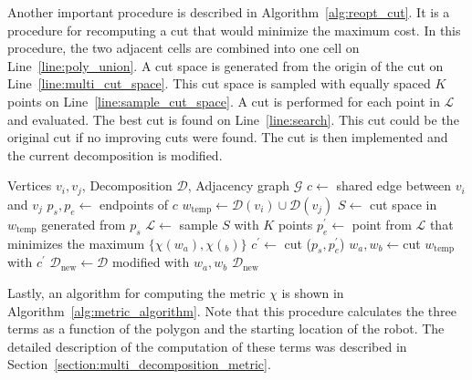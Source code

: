 \documentclass[../main.tex]{subfiles}
\begin{document}
Another important procedure is described in Algorithm~\ref{alg:reopt_cut}. It is a procedure for recomputing a cut that would minimize the maximum cost. In this procedure, the two adjacent cells are combined into one cell on Line~\ref{line:poly_union}. A cut space is generated from the origin of the cut on Line~\ref{line:multi_cut_space}. This cut space is sampled with equally spaced $K$ points on Line~\ref{line:sample_cut_space}. A cut is performed for each point in $\mathcal{L}$ and evaluated. The best cut is found on Line~\ref{line:search}. This cut could be the original cut if no improving cuts were found. The cut is then implemented and the current decomposition is modified.

\begin{algorithm}
	\caption{$\text{reopt\_cut}(v_i, v_j, \mathcal{D},\mathcal{G})$}
	\label{alg:reopt_cut}
	\begin{algorithmic}[1]
		\REQUIRE Vertices $v_i, v_j$, Decomposition $\mathcal{D}$, Adjacency graph $\mathcal{G}$
			\STATE $c\gets$ shared edge between $v_i$ and $v_j$ \label{line:shared_edge}
			\STATE $p_s,p_e\gets$ endpoints of $c$
			\STATE $w_{\text{temp}}\gets \mathcal{D}(v_i)\cup\mathcal{D}(v_j)$ \label{line:poly_union}
			\STATE $S\gets$ cut space in $w_{\text{temp}}$ generated from $p_s$ \label{line:multi_cut_space}
			\STATE $\mathcal{L}\gets$ sample $S$ with $K$ points \label{line:sample_cut_space}
			\STATE $p_e^{'}\gets$ point from $\mathcal{L}$ that minimizes the maximum $\{\chi(w_a),\chi(_b)\}$ \label{line:search}
			\STATE $c^{'}\gets$ cut ($p_s,p_e^{'}$)
			\STATE $w_a,w_b\gets$cut $w_{\text{temp}}$ with $c^{'}$ \label{line:perform_cut}
			\STATE $\mathcal{D}_{\text{new}}\gets\mathcal{D}$ modified with $w_a,w_b$
			\RETURN $\mathcal{D}_{\text{new}}$
	\end{algorithmic}
\end{algorithm}

Lastly, an algorithm for computing the metric $\chi$ is shown in Algorithm~\ref{alg:metric_algorithm}. Note that this procedure calculates the three terms as a function of the polygon and the starting location of the robot. The detailed description of the computation of these terms was described in Section~\ref{section:multi_decomposition_metric}.
\end{document}
